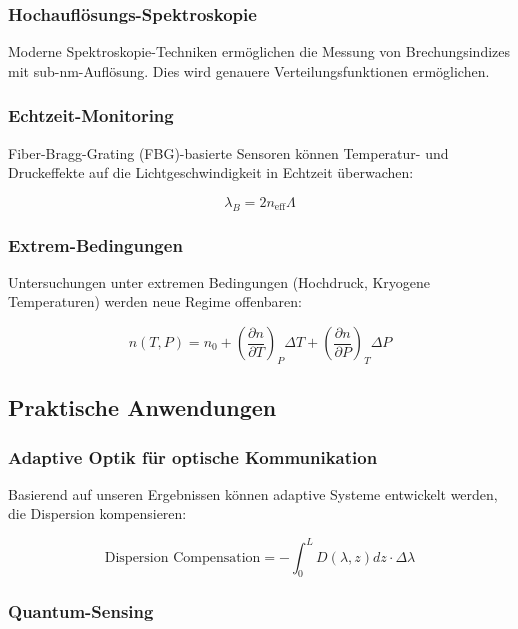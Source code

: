 \documentclass[a4paper,12pt]{article}
\theoremstyle{definition}
\theoremstyle{remark}
\begin{document}
\subsubsection{Hochauflösungs-Spektroskopie}

Moderne Spektroskopie-Techniken ermöglichen die Messung von Brechungsindizes mit sub-nm-Auflösung. Dies wird genauere Verteilungsfunktionen ermöglichen.

\subsubsection{Echtzeit-Monitoring}

Fiber-Bragg-Grating (FBG)-basierte Sensoren können Temperatur- und Druckeffekte auf die Lichtgeschwindigkeit in Echtzeit überwachen:

\begin{equation}
    \lambda_B = 2 n_{\text{eff}} \Lambda
\end{equation}

\subsubsection{Extrem-Bedingungen}

Untersuchungen unter extremen Bedingungen (Hochdruck, Kryogene Temperaturen) werden neue Regime offenbaren:

\begin{equation}
    n(T, P) = n_0 + \left(\frac{\partial n}{\partial T}\right)_P \Delta T + \left(\frac{\partial n}{\partial P}\right)_T \Delta P
\end{equation}

\subsection{Praktische Anwendungen}

\subsubsection{Adaptive Optik für optische Kommunikation}

Basierend auf unseren Ergebnissen können adaptive Systeme entwickelt werden, die Dispersion kompensieren:

\begin{equation}
    \text{Dispersion Compensation} = -\int_0^L D(\lambda, z) dz \cdot \Delta \lambda
\end{equation}

\subsubsection{Quantum-Sensing}
\end{document}
